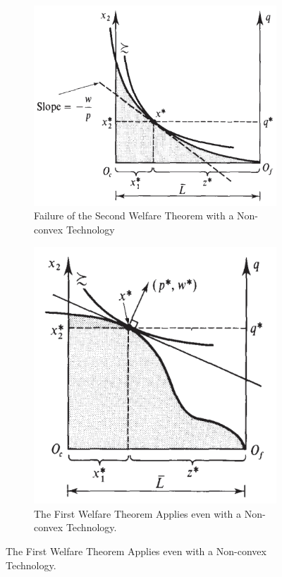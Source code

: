 \documentclass{report}
\begin{document}
			\begin{figure}[h]
				\centering
				\begin{subfigure}{.45\textwidth}
					\centering
					\includegraphics[width=\linewidth]{figures/fail_2FTWE}
					\caption{Failure of the Second Welfare Theorem with a Non-convex Technology}
				\end{subfigure}
				\begin{subfigure}{.45\textwidth}
					\centering
					\includegraphics[width=0.8\linewidth]{figures/succ_1FTWE}
					\caption{The First Welfare Theorem Applies even with a Non-convex Technology.}
				\end{subfigure}
			\end{figure}
	
\end{document}
